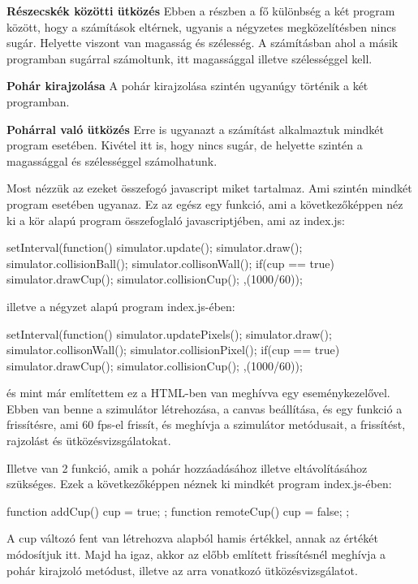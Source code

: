 \textbf{Részecskék közötti ütközés}
Ebben a részben a fő különbség a két program között, hogy a számítások eltérnek, ugyanis a négyzetes megközelítésben nincs sugár. Helyette viszont van magasság és szélesség. A számításban ahol a másik programban sugárral számoltunk, itt magassággal illetve szélességgel kell. 

\textbf{Pohár kirajzolása}
A pohár kirajzolása szintén ugyanúgy történik a két programban. 

\textbf{Pohárral való ütközés}
Erre is ugyanazt a számítást alkalmaztuk mindkét program esetében. Kivétel itt is, hogy nincs sugár, de helyette szintén a magassággal és szélességgel számolhatunk.




Most nézzük az ezeket összefogó javascript miket tartalmaz. Ami szintén mindkét program esetében ugyanaz. Ez az egész egy funkció, ami a következőképpen néz ki a kör alapú program összefoglaló javascriptjében, ami az index.js:
\begin{java}
setInterval(function()
{
  simulator.update();
  simulator.draw();
  simulator.collisionBall();
  simulator.collisonWall();
  if(cup == true)
  {
    simulator.drawCup();
    simulator.collisionCup();
  }		
},(1000/60));
	
\end{java}
illetve a négyzet alapú program index.js-ében:
\begin{java}
setInterval(function()
{
  simulator.updatePixels();
  simulator.draw();
  simulator.collisonWall();
  simulator.collisionPixel();
  if(cup == true)
  {
    simulator.drawCup();
    simulator.collisionCup();
  }
},(1000/60));
	
\end{java}
és mint már említettem ez a HTML-ben van meghívva egy eseménykezelővel. Ebben van benne a szimulátor létrehozása, a canvas beállítása, és egy funkció a frissítésre, ami 60 fps-el frissít, és meghívja a szimulátor metódusait, a frissítést, rajzolást és ütközésvizsgálatokat. 

Illetve van 2 funkció, amik a pohár hozzáadásához illetve eltávolításához szükséges. Ezek a következőképpen néznek ki mindkét program index.js-ében:
\begin{java}
function addCup(){
  cup = true;
};
function remoteCup(){
  cup = false;
};
	
\end{java}
A cup változó fent van létrehozva alapból hamis értékkel, annak az értékét módosítjuk itt. Majd ha igaz, akkor az előbb említett frissítésnél meghívja a pohár kirajzoló metódust, illetve az arra vonatkozó ütközésvizsgálatot.


